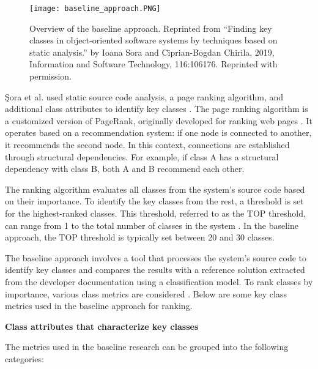 \begin{figure}[H]
\centering
\texttt{[image: baseline\_approach.PNG]}
\caption{Overview of the baseline approach. Reprinted from “Finding key classes in object-oriented
software systems by techniques based on static analysis.” by Ioana Sora and Ciprian-Bogdan Chirila, 2019, Information and Software Technology, 116:106176. Reprinted with permission. }
\label{fig:baseline_approach}
\centering
\end{figure}


Şora et al. used static source code analysis, a page ranking algorithm, and additional class attributes to identify key classes \cite{PagerankENASE, enase15, PagerankSACI, Finding-key-classes}. The page ranking algorithm is a customized version of PageRank, originally developed for ranking web pages \cite{ilprints422}. It operates based on a recommendation system: if one node is connected to another, it recommends the second node. In this context, connections are established through structural dependencies. For example, if class A has a structural dependency with class B, both A and B recommend each other.

The ranking algorithm evaluates all classes from the system’s source code based on their importance. To identify the key classes from the rest, a threshold is set for the highest-ranked classes. This threshold, referred to as the TOP threshold, can range from 1 to the total number of classes in the system \cite{b4}. In the baseline approach, the TOP threshold is typically set between 20 and 30 classes.


The baseline approach involves a tool that processes the system’s source code to identify key classes and compares the results with a reference solution extracted from the developer documentation using a classification model. To rank classes by importance, various class metrics are considered \cite{Ding2016AnIA, ZaidmanJurnal, PAN2018188}. Below are some key class metrics used in the baseline approach for ranking.

\textbf{Class attributes that characterize key classes}


The metrics used in the baseline research can be grouped into the following categories: 

